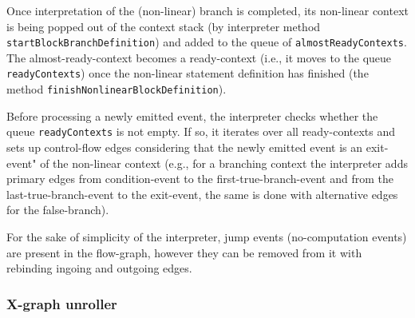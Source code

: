 Once interpretation of the (non-linear) branch is completed, its non-linear context is being popped out of the context stack (by interpreter method \texttt{startBlockBranchDefinition}) and added to the queue of \texttt{almostReadyContexts}.
The almost-ready-context becomes a ready-context (i.e., it moves to the queue \texttt{readyContexts}) once the non-linear statement definition has finished (the method \texttt{finishNonlinearBlockDefinition}).

Before processing a newly emitted event, the interpreter checks whether the queue \texttt{readyContexts} is not empty.
If so, it iterates over all ready-contexts and sets up control-flow edges considering that the newly emitted event is an exit-event" of the non-linear context (e.g., for a branching context the interpreter adds primary edges from condition-event to the first-true-branch-event and from the last-true-branch-event to the exit-event, the same is done with alternative edges for the false-branch).


For the sake of simplicity of the interpreter, jump events (no-computation events) are present in the flow-graph, however they can be removed from it with rebinding ingoing and outgoing edges.




\subsubsection{X-graph unroller}
\label{ch:impl:proc:x-unroll}

